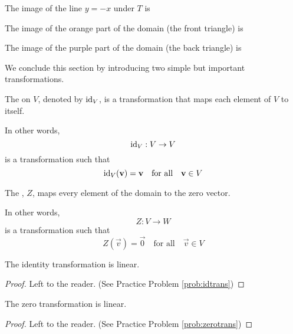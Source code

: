 \documentclass{ximera}
\begin{document}
\begin{example}
\begin{explanation}
The image of the line $y=-x$ under $T$ is 

The image of the orange part of the domain (the front triangle) is  

The image of the purple part of the domain (the back triangle) is  

\end{explanation}
\end{example}

We conclude this section by introducing two simple but important transformations.

\begin{definition}\label{def:idtransonrn}
The  on $V$, denoted by $\text{id}_V$, is a transformation that maps each element of $V$ to itself.

In other words,
$$\text{id}_V:V\rightarrow V$$ is a transformation such that $$\text{id}_V(\mathbf{v})=\mathbf{v}\quad\text{for all}\quad \mathbf{v} \in V$$
\end{definition}

\begin{definition}\label{def:zerotransonrn}
The , $Z$, maps every element of the domain to the zero vector.

In other words,
$$Z:V\rightarrow W$$ is a transformation such that $$Z(\vec{v})=\vec{0}\quad\text{for all}\quad \vec{v} \in V$$
\end{definition}

\begin{theorem}\label{th:idlintrans}
The identity transformation is linear.
\end{theorem}
\begin{proof}
Left to the reader. (See Practice Problem \ref{prob:idtrans})
\end{proof}

\begin{theorem}\label{th:zerolintrans}
The zero transformation is linear.
\end{theorem}
\begin{proof}
Left to the reader.  (See Practice Problem \ref{prob:zerotrans})
\end{proof}
\end{document}
